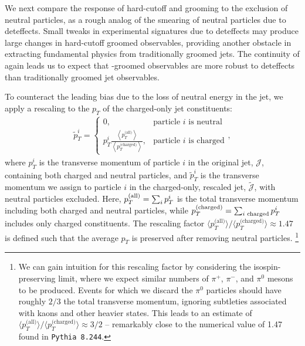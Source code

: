 We next compare the response of hard-cutoff and \PIRANHA{} grooming to the exclusion of neutral particles, as a rough analog of the smearing of neutral particles due to \gls{deteffects}.
%
Small tweaks in experimental signatures due to \gls{deteffects} may produce large changes in hard-cutoff groomed observables, providing another obstacle in extracting fundamental physics from traditionally groomed jets.
%
The continuity of \PIRANHA{} again leads us to expect that \PIRANHA{}-groomed observables are more robust to \gls{deteffects} than traditionally groomed jet observables.


To counteract the leading bias due to the loss of neutral energy in the jet, we apply a rescaling to the \(p_T\) of the charged-only jet constituents:
%
\begin{align}
    \tilde p_T^i =
    \begin{cases}
        0,
        &\text{particle }i\text{ is neutral}
        \\
        p_T^i
        \frac{\left\langle p_T^\text{(all)}\right\rangle}{\left\langle p_T^\text{(charged)}\right\rangle},
        &\text{particle }i\text{ is charged}
    \end{cases}
    ,
    \label{eq:all-charged_rescaling}
\end{align}
where \(p_T^i\) is the transverse momentum of particle \(i\) in the original jet, \(\mathcal{J}\), containing both charged and neutral particles, and \(\tilde p_T^i\) is the transverse momentum we assign to particle \(i\) in the charged-only, rescaled jet, \(\tilde{\mathcal{J}}\), with neutral particles excluded.
%
Here, \(p_T^{\rm(all)} = \sum_i p_T^i\) is the total transverse momentum including both charged and neutral particles, while \(p_T^{\rm(charged)} = \sum_{i\text{ charged}} p_T^i\) includes only charged constituents.
%
The rescaling factor \(\big\langle p_T^\text{(all)}\big\rangle/\big\langle p_T^\text{(charged)}\big\rangle\)\(\approx\)\(1.47\) is defined such that the average $p_T$ is preserved after removing neutral particles.%
\footnote{
We can gain intuition for this rescaling factor by considering the isospin-preserving limit, where we expect similar numbers of \(\pi^+\), \(\pi^-\), and \(\pi^0\) mesons to be produced.
%
Events for which we discard the \(\pi^0\) particles should have roughly \(2/3\) the total transverse momentum, ignoring subtleties associated with kaons and other heavier states.
%
This leads to an estimate of \(\big\langle p_T^\text{(all)}\big\rangle/\big\langle p_T^\text{(charged)}\big\rangle \approx 3/2\) -- remarkably close to the numerical value of 1.47 found in \texttt{Pythia 8.244}.
}

